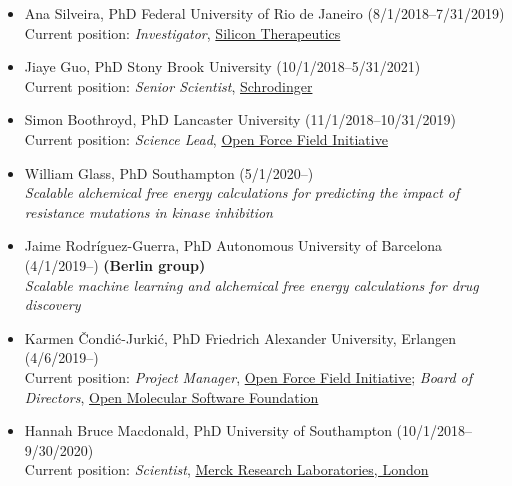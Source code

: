 \documentclass[10pt]{article}
\begin{document}
\begin{itemize}
  \item Ana Silveira, PhD Federal University of Rio de Janeiro (8/1/2018--7/31/2019)\\
  Current position: \emph{Investigator}, \href{https://silicontx.com/}{Silicon Therapeutics}

  \item Jiaye Guo, PhD Stony Brook University (10/1/2018--5/31/2021)\\
  Current position: \emph{Senior Scientist}, \href{http://schrodinger.com}{Schrodinger}
  
  \item Simon Boothroyd, PhD Lancaster University (11/1/2018--10/31/2019)\\
  Current position: \emph{Science Lead}, \href{http://openforcefield.org}{Open Force Field Initiative}

  \item William Glass, PhD Southampton (5/1/2020--) \\
  \emph{Scalable alchemical free energy calculations for predicting the impact of resistance mutations in kinase inhibition}

  \item Jaime Rodr\'{i}guez-Guerra, PhD Autonomous University of Barcelona (4/1/2019--) {\bf (Berlin group)}\\
  \emph{Scalable machine learning and alchemical free energy calculations for drug discovery}

  \item Karmen \v{C}ondi\'{c}-Jurki\'{c}, PhD Friedrich Alexander University, Erlangen (4/6/2019--)\\
  Current position: \emph{Project Manager}, \href{http://openforcefield.org}{Open Force Field Initiative}; \emph{Board of Directors}, \href{http://omsf.io}{Open Molecular Software Foundation}

  \item Hannah Bruce Macdonald, PhD University of Southampton (10/1/2018--9/30/2020)\\
  Current position: \emph{Scientist}, \href{http://www.merck.com}{Merck Research Laboratories, London}
  

\end{itemize}
\end{document}

